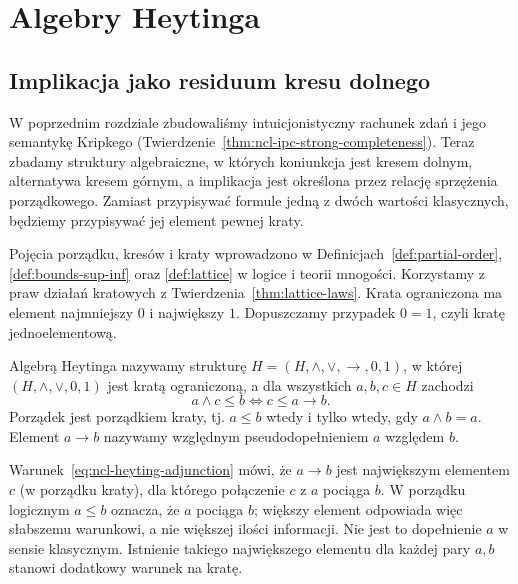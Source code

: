 \chapter{Algebry Heytinga}\label{ch:ncl-heyting}

\section{Implikacja jako residuum kresu dolnego}

W poprzednim rozdziale zbudowaliśmy intuicjonistyczny
rachunek zdań i jego semantykę Kripkego
(Twierdzenie~\ref{thm:ncl-ipc-strong-completeness}).
Teraz zbadamy struktury algebraiczne, w których
koniunkcja jest kresem dolnym, alternatywa kresem
górnym, a implikacja jest określona przez relację
sprzężenia porządkowego. Zamiast przypisywać formule
jedną z dwóch wartości klasycznych, będziemy
przypisywać jej element pewnej kraty.

Pojęcia porządku, kresów i kraty wprowadzono w
Definicjach~\ref{def:partial-order},
\ref{def:bounds-sup-inf} oraz \ref{def:lattice}
w logice i teorii mnogości. Korzystamy z praw
działań kratowych z Twierdzenia~\ref{thm:lattice-laws}.
Krata ograniczona ma element najmniejszy $0$
i największy $1$. Dopuszczamy przypadek $0=1$,
czyli kratę jednoelementową.

\begin{definicja}
\label{def:ncl-heyting}
Algebrą Heytinga nazywamy strukturę
$H=(H,\wedge,\vee,\to,0,1)$, w której
$(H,\wedge,\vee,0,1)$ jest kratą ograniczoną,
a dla wszystkich $a,b,c\in H$ zachodzi
\begin{equation}
\label{eq:ncl-heyting-adjunction}
 a\wedge c\leq b
 \iff c\leq a\to b.
\end{equation}
Porządek jest porządkiem kraty, tj.
$a\leq b$ wtedy i tylko wtedy, gdy $a\wedge b=a$.
Element $a\to b$ nazywamy względnym
pseudodopełnieniem $a$ względem $b$.
\end{definicja}

Warunek~\eqref{eq:ncl-heyting-adjunction} mówi,
że $a\to b$ jest największym elementem $c$
(w porządku kraty), dla którego połączenie
$c$ z $a$ pociąga $b$. W porządku logicznym
$a\leq b$ oznacza, że $a$ pociąga $b$;
większy element odpowiada więc słabszemu
warunkowi, a nie większej ilości informacji.
Nie jest to dopełnienie $a$ w sensie klasycznym.
Istnienie takiego największego elementu dla każdej
pary $a,b$ stanowi dodatkowy warunek na kratę.

